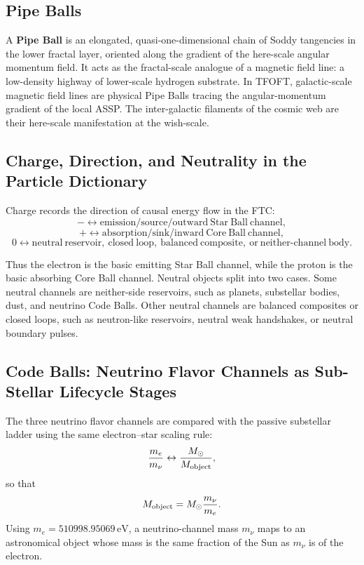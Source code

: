 \documentclass[11pt,a4paper]{article}
\begin{document}
  \subsection{Pipe Balls}

    A \textbf{Pipe Ball} is an elongated, quasi-one-dimensional chain of Soddy tangencies in the lower fractal layer, oriented along the gradient of the here-scale angular momentum field. It acts as the fractal-scale analogue of a magnetic field line: a low-density highway of lower-scale hydrogen substrate. In TFOFT, galactic-scale magnetic field lines are physical Pipe Balls tracing the angular-momentum gradient of the local ASSP. The inter-galactic filaments of the cosmic web are their here-scale manifestation at the wish-scale.

  \subsection{Charge, Direction, and Neutrality in the Particle Dictionary}

    Charge records the direction of causal energy flow in the FTC:
    \[
    - \leftrightarrow \mathrm{emission/source/outward\ Star\ Ball\ channel},
    \]
    \[
    + \leftrightarrow \mathrm{absorption/sink/inward\ Core\ Ball\ channel},
    \]
    \[
    0 \leftrightarrow \mathrm{neutral\ reservoir,\ closed\ loop,\ balanced\ composite,\ or\ neither\mbox{-}channel\ body}.
    \]

    Thus the electron is the basic emitting Star Ball channel, while the proton is the basic absorbing Core Ball channel. Neutral objects split into two cases. Some neutral channels are neither-side reservoirs, such as planets, substellar bodies, dust, and neutrino Code Balls. Other neutral channels are balanced composites or closed loops, such as neutron-like reservoirs, neutral weak handshakes, or neutral boundary pulses.

  \subsection{Code Balls: Neutrino Flavor Channels as Sub-Stellar Lifecycle Stages}

    The three neutrino flavor channels are compared with the passive substellar ladder using the same electron--star scaling rule:
    \[
    \frac{m_e}{m_\nu}
    \leftrightarrow
    \frac{M_\odot}{M_{\rm object}},
    \]
    so that
    \[
    M_{\rm object}=M_\odot\frac{m_\nu}{m_e}.
    \]
    Using \(m_e=510998.95069\,\mathrm{eV}\), a neutrino-channel mass \(m_\nu\) maps to an astronomical object whose mass is the same fraction of the Sun as \(m_\nu\) is of the electron.
\end{document}
